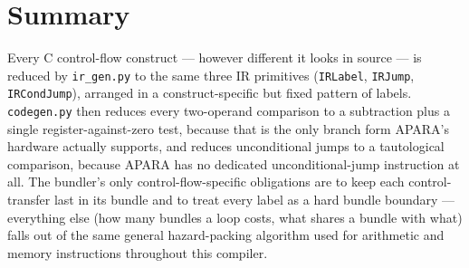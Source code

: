 \documentclass[11pt,a4paper]{article}
\begin{document}
\section{Summary}

Every C control-flow construct --- however different it looks in source --- is reduced by
\texttt{ir\_gen.py} to the same three IR primitives (\texttt{IRLabel}, \texttt{IRJump},
\texttt{IRCondJump}), arranged in a construct-specific but fixed pattern of labels.
\texttt{codegen.py} then reduces every two-operand comparison to a subtraction plus a
single register-against-zero test, because that is the only branch form APARA's hardware
actually supports, and reduces unconditional jumps to a tautological comparison, because
APARA has no dedicated unconditional-jump instruction at all. The bundler's only
control-flow-specific obligations are to keep each control-transfer last in its bundle and
to treat every label as a hard bundle boundary --- everything else (how many bundles a loop
costs, what shares a bundle with what) falls out of the same general hazard-packing
algorithm used for arithmetic and memory instructions throughout this compiler.
\end{document}
